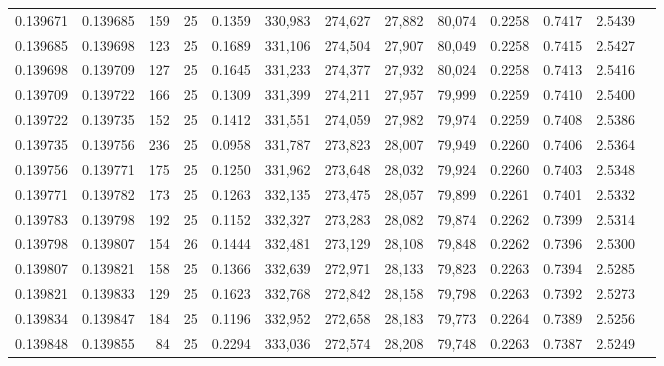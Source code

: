 \begin{tabular}{rrrrrrrrrrrrr}
0.139671 & 0.139685 &   159 &  25 &                                     0.1359 & 330,983 & 274,627 &  27,882 &  80,074 & 0.2258 & 0.7417 & 2.5439 \\
0.139685 & 0.139698 &   123 &  25 &                                     0.1689 & 331,106 & 274,504 &  27,907 &  80,049 & 0.2258 & 0.7415 & 2.5427 \\
0.139698 & 0.139709 &   127 &  25 &                                     0.1645 & 331,233 & 274,377 &  27,932 &  80,024 & 0.2258 & 0.7413 & 2.5416 \\
0.139709 & 0.139722 &   166 &  25 &                                     0.1309 & 331,399 & 274,211 &  27,957 &  79,999 & 0.2259 & 0.7410 & 2.5400 \\
0.139722 & 0.139735 &   152 &  25 &                                     0.1412 & 331,551 & 274,059 &  27,982 &  79,974 & 0.2259 & 0.7408 & 2.5386 \\
0.139735 & 0.139756 &   236 &  25 &                                     0.0958 & 331,787 & 273,823 &  28,007 &  79,949 & 0.2260 & 0.7406 & 2.5364 \\
0.139756 & 0.139771 &   175 &  25 &                                     0.1250 & 331,962 & 273,648 &  28,032 &  79,924 & 0.2260 & 0.7403 & 2.5348 \\
0.139771 & 0.139782 &   173 &  25 &                                     0.1263 & 332,135 & 273,475 &  28,057 &  79,899 & 0.2261 & 0.7401 & 2.5332 \\
0.139783 & 0.139798 &   192 &  25 &                                     0.1152 & 332,327 & 273,283 &  28,082 &  79,874 & 0.2262 & 0.7399 & 2.5314 \\
0.139798 & 0.139807 &   154 &  26 &                                     0.1444 & 332,481 & 273,129 &  28,108 &  79,848 & 0.2262 & 0.7396 & 2.5300 \\
0.139807 & 0.139821 &   158 &  25 &                                     0.1366 & 332,639 & 272,971 &  28,133 &  79,823 & 0.2263 & 0.7394 & 2.5285 \\
0.139821 & 0.139833 &   129 &  25 &                                     0.1623 & 332,768 & 272,842 &  28,158 &  79,798 & 0.2263 & 0.7392 & 2.5273 \\
0.139834 & 0.139847 &   184 &  25 &                                     0.1196 & 332,952 & 272,658 &  28,183 &  79,773 & 0.2264 & 0.7389 & 2.5256 \\
0.139848 & 0.139855 &    84 &  25 &                                     0.2294 & 333,036 & 272,574 &  28,208 &  79,748 & 0.2263 & 0.7387 & 2.5249 \\

\end{tabular}

